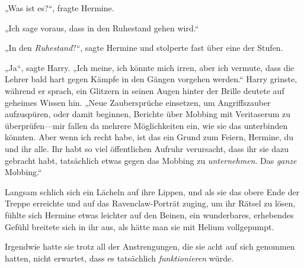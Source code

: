 „Was ist es?“, fragte Hermine.

„Ich sage voraus, dass \SPHEW in den Ruhestand gehen wird.“

„In den \emph{Ruhestand}?“, sagte Hermine und stolperte fast über eine der Stufen.

„Ja“, sagte Harry. „Ich meine, ich könnte mich irren, aber ich vermute, dass die Lehrer bald hart gegen Kämpfe in den Gängen vorgehen werden.“ Harry grinste, während er sprach, ein Glitzern in seinen Augen hinter der Brille deutete auf geheimes Wissen hin. „Neue Zaubersprüche einsetzen, um Angriffszauber aufzuspüren, oder damit beginnen, Berichte über Mobbing mit Veritaserum zu überprüfen—mir fallen da mehrere Möglichkeiten ein, wie sie das unterbinden könnten. Aber wenn ich recht habe, ist das ein Grund zum Feiern, Hermine, du und ihr alle. Ihr habt so viel öffentlichen Aufruhr verursacht, dass ihr sie dazu gebracht habt, tatsächlich etwas gegen das Mobbing zu \emph{unternehmen}. Das \emph{ganze} Mobbing.“

Langsam schlich sich ein Lächeln auf ihre Lippen, und als sie das obere Ende der Treppe erreichte und auf das Ravenclaw-Porträt zuging, um ihr Rätsel zu lösen, fühlte sich Hermine etwas leichter auf den Beinen, ein wunderbares, erhebendes Gefühl breitete sich in ihr aus, als hätte man sie mit Helium vollgepumpt.

Irgendwie hatte sie trotz all der Anstrengungen, die sie acht auf sich genommen hatten, nicht erwartet, dass es tatsächlich \emph{funktionieren} würde.


